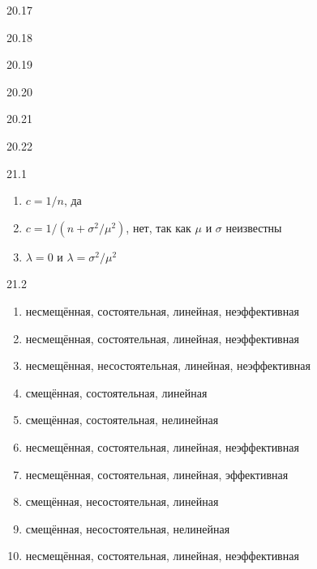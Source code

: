 \protect \hypertarget {soln:20.17}{}
\begin{solution}{{20.17}}
\end{solution}
\protect \hypertarget {soln:20.18}{}
\begin{solution}{{20.18}}
\end{solution}
\protect \hypertarget {soln:20.19}{}
\begin{solution}{{20.19}}
\end{solution}
\protect \hypertarget {soln:20.20}{}
\begin{solution}{{20.20}}
\end{solution}
\protect \hypertarget {soln:20.21}{}
\begin{solution}{{20.21}}
\end{solution}
\protect \hypertarget {soln:20.22}{}
\begin{solution}{{20.22}}
\end{solution}
\protect \hypertarget {soln:21.1}{}
\begin{solution}{{21.1}}
    \begin{enumerate}
      \item $c=1/n$, да
      \item $c=1/(n+\sigma^2/\mu^2)$, нет, так как $\mu$ и $\sigma$ неизвестны
      \item $\lambda=0$ и $\lambda=\sigma^2/\mu^2$
    \end{enumerate}
  
\end{solution}
\protect \hypertarget {soln:21.2}{}
\begin{solution}{{21.2}}
    \begin{enumerate}
    \item несмещённая, состоятельная, линейная, неэффективная
    \item несмещённая, состоятельная, линейная, неэффективная
    \item несмещённая, несостоятельная, линейная, неэффективная
    \item смещённая, состоятельная, линейная
    \item смещённая, состоятельная, нелинейная
    \item несмещённая, состоятельная, линейная, неэффективная
    \item несмещённая, состоятельная, линейная, эффективная
    \item смещённая, несостоятельная, линейная
    \item смещённая, несостоятельная, нелинейная
    \item несмещённая, состоятельная, линейная, неэффективная
    \end{enumerate}
  
\end{solution}
